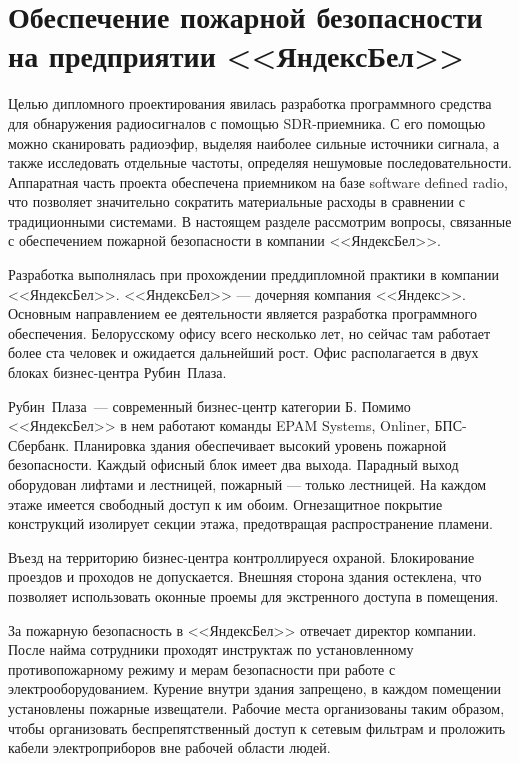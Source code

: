 \newcommand{\yandex}{\mbox{<<Яндекс>>}}
\newcommand{\yandexbel}{\mbox{<<ЯндексБел>>}}
\newcommand{\rubinplaza}{\mbox{Рубин Плаза}}

\section[Обеспечение пожарной безопасности на предприятии]{Обеспечение пожарной безопасности на предприятии \yandexbel{}}

Целью дипломного проектирования явилась разработка программного средства для обнаружения радиосигналов с помощью SDR-приемника. С его помощью можно сканировать радиоэфир, выделяя наиболее сильные источники сигнала, а также исследовать отдельные частоты, определяя нешумовые последовательности. Аппаратная часть проекта обеспечена приемником на базе software defined radio, что позволяет значительно сократить материальные расходы в сравнении с традиционными системами. В настоящем разделе рассмотрим вопросы, связанные с обеспечением пожарной безопасности в компании \yandexbel{}.

Разработка выполнялась при прохождении преддипломной практики в компании \yandexbel{}. \yandexbel{} --- дочерняя компания \yandex{}. Основным направлением ее деятельности является разработка программного обеспечения. Белорусскому офису всего несколько лет, но сейчас там работает более ста человек и ожидается дальнейший рост. Офис располагается в двух блоках бизнес-центра \rubinplaza{}.

\rubinplaza~--- современный бизнес-центр категории Б. Помимо \yandexbel{} в нем работают команды EPAM Systems, Onliner, БПС-Сбербанк. Планировка здания обеспечивает высокий уровень пожарной безопасности. Каждый офисный блок имеет два выхода. Парадный выход оборудован лифтами и лестницей, пожарный --- только лестницей. На каждом этаже имеется свободный доступ к им обоим. Огнезащитное покрытие конструкций изолирует секции этажа, предотвращая распространение пламени.

Въезд на территорию бизнес-центра контроллируеся охраной. Блокирование проездов и проходов не допускается. Внешняя сторона здания остеклена, что позволяет использовать оконные проемы для экстренного доступа в помещения.

За пожарную безопасность в \yandexbel{} отвечает директор компании. После найма сотрудники проходят инструктаж по установленному противопожарному режиму и мерам безопасности при работе с электрооборудованием. Курение внутри здания запрещено, в каждом помещении установлены пожарные извещатели. Рабочие места организованы таким образом, чтобы организовать беспрепятственный доступ к сетевым фильтрам и проложить кабели электроприборов вне рабочей области людей.

